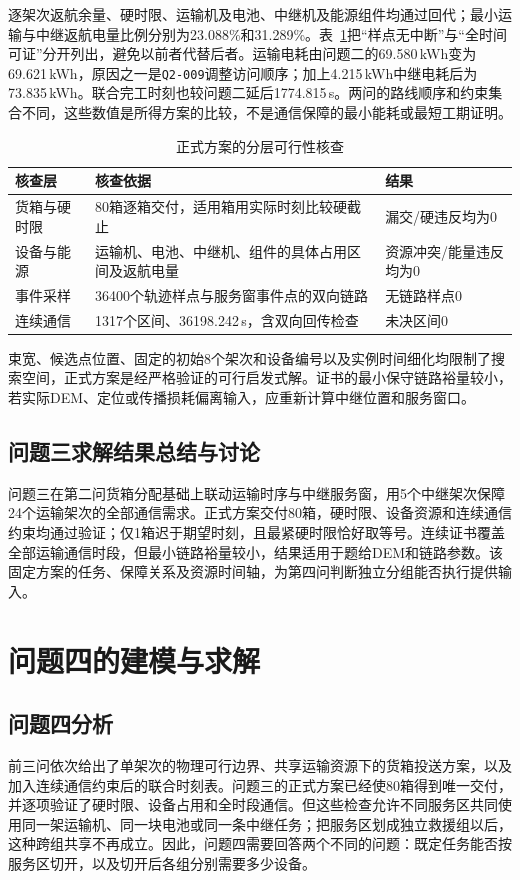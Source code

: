 \documentclass[bwprint,fontset=fandol]{gmcmthesis}
\begin{document}
逐架次返航余量、硬时限、运输机及电池、中继机及能源组件均通过回代；最小运输与中继返航电量比例分别为23.088\%和31.289\%。表~\ref{tab:q3-verification}把“样点无中断”与“全时间可证”分开列出，避免以前者代替后者。运输电耗由问题二的69.580\,kWh变为69.621\,kWh，原因之一是\texttt{Q2-009}调整访问顺序；加上4.215\,kWh中继电耗后为73.835\,kWh。联合完工时刻也较问题二延后1774.815\,s。两问的路线顺序和约束集合不同，这些数值是所得方案的比较，不是通信保障的最小能耗或最短工期证明。
\begin{table}[htbp]
\centering\small
\caption{正式方案的分层可行性核查}
\label{tab:q3-verification}
\begin{tabular}{@{}p{}p{}p{}@{}}
\toprule
核查层 & 核查依据 & 结果\\
\midrule
货箱与硬时限 & 80箱逐箱交付，适用箱用实际时刻比较硬截止 & 漏交/硬违反均为0\\
设备与能源 & 运输机、电池、中继机、组件的具体占用区间及返航电量 & 资源冲突/能量违反均为0\\
事件采样 & 36400个轨迹样点与服务窗事件点的双向链路 & 无链路样点0\\
连续通信 & 1317个区间、36198.242\,s，含双向回传检查 & 未决区间0\\
\bottomrule
\end{tabular}
\end{table}

束宽、候选点位置、固定的初始8个架次和设备编号以及实例时间细化均限制了搜索空间，正式方案是经严格验证的可行启发式解。证书的最小保守链路裕量较小，若实际DEM、定位或传播损耗偏离输入，应重新计算中继位置和服务窗口。

\subsection{问题三求解结果总结与讨论}
问题三在第二问货箱分配基础上联动运输时序与中继服务窗，用5个中继架次保障24个运输架次的全部通信需求。正式方案交付80箱，硬时限、设备资源和连续通信约束均通过验证；仅1箱迟于期望时刻，且最紧硬时限恰好取等号。连续证书覆盖全部运输通信时段，但最小链路裕量较小，结果适用于题给DEM和链路参数。该固定方案的任务、保障关系及资源时间轴，为第四问判断独立分组能否执行提供输入。


\section{问题四的建模与求解}
\subsection{问题四分析}
前三问依次给出了单架次的物理可行边界、共享运输资源下的货箱投送方案，以及加入连续通信约束后的联合时刻表。问题三的正式方案已经使80箱得到唯一交付，并逐项验证了硬时限、设备占用和全时段通信。但这些检查允许不同服务区共同使用同一架运输机、同一块电池或同一条中继任务；把服务区划成独立救援组以后，这种跨组共享不再成立。因此，问题四需要回答两个不同的问题：既定任务能否按服务区切开，以及切开后各组分别需要多少设备。
\end{document}
